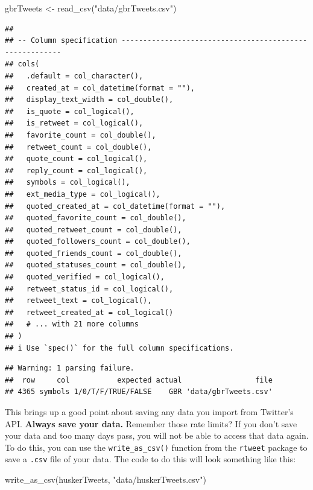 \documentclass[
]{book}
\newenvironment{Shaded}{\begin{snugshade}}{\end{snugshade}}
\newcommand{\FunctionTok}[1]{\textcolor[rgb]{0.00,0.00,0.00}{#1}}
\newcommand{\NormalTok}[1]{#1}
\newcommand{\OtherTok}[1]{\textcolor[rgb]{0.56,0.35,0.01}{#1}}
\newcommand{\StringTok}[1]{\textcolor[rgb]{0.31,0.60,0.02}{#1}}
\begin{document}
\begin{Shaded}
\begin{Highlighting}[]
\NormalTok{gbrTweets }\OtherTok{\textless{}{-}} \FunctionTok{read\_csv}\NormalTok{(}\StringTok{"data/gbrTweets.csv"}\NormalTok{)}
\end{Highlighting}
\end{Shaded}

\begin{verbatim}
## 
## -- Column specification --------------------------------------------------------
## cols(
##   .default = col_character(),
##   created_at = col_datetime(format = ""),
##   display_text_width = col_double(),
##   is_quote = col_logical(),
##   is_retweet = col_logical(),
##   favorite_count = col_double(),
##   retweet_count = col_double(),
##   quote_count = col_logical(),
##   reply_count = col_logical(),
##   symbols = col_logical(),
##   ext_media_type = col_logical(),
##   quoted_created_at = col_datetime(format = ""),
##   quoted_favorite_count = col_double(),
##   quoted_retweet_count = col_double(),
##   quoted_followers_count = col_double(),
##   quoted_friends_count = col_double(),
##   quoted_statuses_count = col_double(),
##   quoted_verified = col_logical(),
##   retweet_status_id = col_logical(),
##   retweet_text = col_logical(),
##   retweet_created_at = col_logical()
##   # ... with 21 more columns
## )
## i Use `spec()` for the full column specifications.
\end{verbatim}

\begin{verbatim}
## Warning: 1 parsing failure.
##  row     col           expected actual                 file
## 4365 symbols 1/0/T/F/TRUE/FALSE    GBR 'data/gbrTweets.csv'
\end{verbatim}

This brings up a good point about saving any data you import from Twitter's API. \textbf{Always save your data.} Remember those rate limits? If you don't save your data and too many days pass, you will not be able to access that data again. To do this, you can use the \texttt{write\_as\_csv()} function from the \texttt{rtweet} package to save a \texttt{.csv} file of your data. The code to do this will look something like this:

\begin{Shaded}
\begin{Highlighting}[]
\FunctionTok{write\_as\_csv}\NormalTok{(huskerTweets, }\StringTok{"data/huskerTweets.csv"}\NormalTok{)}
\end{Highlighting}
\end{Shaded}
\end{document}

